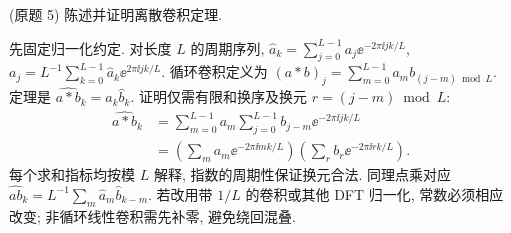 \begin{exercise}\label{ps8-q5}
(原题 5) 陈述并证明离散卷积定理.
\end{exercise}
\begin{solution}
先固定归一化约定. 对长度 $L$ 的周期序列,
$\widehat a_k=\sum_{j=0}^{L-1}a_j\ee^{-2\pi\ii jk/L}$,
$a_j=L^{-1}\sum_{k=0}^{L-1}\widehat a_k\ee^{2\pi\ii jk/L}$.
循环卷积定义为 $(a*b)_j=\sum_{m=0}^{L-1}a_m b_{(j-m)\bmod L}$.
定理是 $\widehat{a*b}_k=\widehat a_k\widehat b_k$.
证明仅需有限和换序及换元 $r=(j-m)\bmod L$:
\[
\begin{split}
\widehat{a*b}_k
&=\sum_{m=0}^{L-1}a_m\sum_{j=0}^{L-1}b_{j-m}\ee^{-2\pi\ii jk/L}\\
&=\left(\sum_m a_m\ee^{-2\pi\ii mk/L}\right)
\left(\sum_r b_r\ee^{-2\pi\ii rk/L}\right).
\end{split}
\]
每个求和指标均按模 $L$ 解释, 指数的周期性保证换元合法. 同理点乘对应
$\widehat{ab}_k=L^{-1}\sum_m\widehat a_m\widehat b_{k-m}$.
若改用带 $1/L$ 的卷积或其他 DFT 归一化, 常数必须相应改变; 非循环线性卷积需先补零, 避免绕回混叠.
\end{solution}
